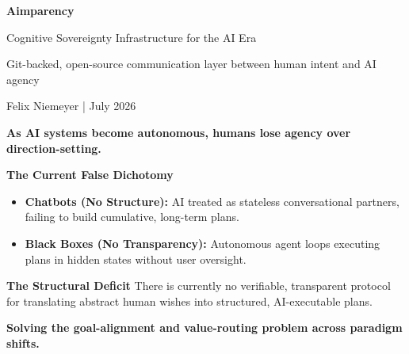 \documentclass[12pt]{article}
\newcommand{\slide}[1]{%
  \clearpage
  \pagecolor{bgdark}
  \color{textlight}
  \noindent{\Large\bfseries\color{aimgold}{#1}}\par
  \vspace{0.6cm}
}
\newcommand{\col}[2]{%
  \begin{minipage}[t]{#1\textwidth}
    #2
  \end{minipage}%
}
\newcommand{\card}[2]{%
  \colorbox{bgcard}{%
    \begin{minipage}{\dimexpr#1\textwidth-2\fboxsep-2\fboxrule\relax}%
      \vspace{0.2cm}%
      \color{textlight}%
      #2%
      \vspace{0.2cm}%
    \end{minipage}%
  }%
}
\newenvironment{slideitemize}{%
  \begin{itemize}%
    \setlength{\itemsep}{4pt}%
    \setlength{\parskip}{0pt}%
    \setlength{\parsep}{0pt}%
}{%
  \end{itemize}%
}
\begin{document}
\pagecolor{bgdark}
\color{textlight}

\vspace*{2.2cm}
\begin{center}
  {\Huge\bfseries\color{textlight} Aimparency}\par
  \vspace{0.4cm}
  {\large\color{aimgold} Cognitive Sovereignty Infrastructure for the AI Era}\par
  \vspace{0.6cm}
  {\normalsize\color{textmuted} Git-backed, open-source communication layer between human intent and AI agency}\par
  \vspace{2.2cm}
  {\small Felix Niemeyer \quad | \quad July 2026}
\end{center}

\slide{The Problem: The AI Agency Steering Gap}
\large \textbf{As AI systems become autonomous, humans lose agency over direction-setting.}
\vspace{0.8cm}
\normalsize

\col{0.48}{
  \textbf{The Current False Dichotomy}
  \vspace{0.2cm}
  \begin{slideitemize}
    \item \textbf{Chatbots (No Structure):} AI treated as stateless conversational partners, failing to build cumulative, long-term plans.
    \item \textbf{Black Boxes (No Transparency):} Autonomous agent loops executing plans in hidden states without user oversight.
  \end{slideitemize}
}
\hfill
\col{0.48}{
  \card{1.0}{
    \hspace{0.2cm}%
    \begin{minipage}{\dimexpr\textwidth-0.4cm\relax}
      \textbf{\color{aimgold}The Structural Deficit}
      \vspace{0.2cm}
      There is currently no verifiable, transparent protocol for translating abstract human wishes into structured, AI-executable plans.
    \end{minipage}
  }
}

\slide{Origin Story: The Evolution of Summits}
\large \textbf{Solving the goal-alignment and value-routing problem across paradigm shifts.}
\vspace{0.8cm}
\normalsize
\end{document}
